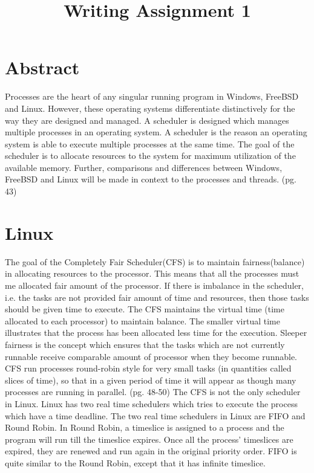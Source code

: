 \documentclass[letterpaper,10pt,titlepage]{IEEEtran}
\author{\name}
\title{Writing Assignment 1}
\begin{document}
\maketitle
\hrulefill

\section{Abstract}

Processes are the heart of any singular running program in Windows, FreeBSD and Linux.
However, these operating systems differentiate distinctively for the way they are designed and managed. A scheduler is designed which manages multiple processes in an operating system. A scheduler is the reason an operating system is able to execute multiple processes at the same time. The goal of the scheduler is to allocate resources to the system for maximum utilization of the available memory. Further, comparisons and differences between Windows, FreeBSD and Linux will be made in context to the processes and threads. \cite{Love} (pg. 43)

\section{Linux}
The goal of the Completely Fair Scheduler(CFS) is to maintain fairness(balance) in allocating resources to the processor. This means that all the processes must me allocated fair amount of the processor. If there is imbalance in the scheduler, i.e. the tasks are not provided fair amount of time and resources, then those tasks should be given time to execute. \cite{sarkar:online}
The CFS maintains the virtual time (time allocated to each processor) to maintain balance. The smaller virtual time illustrates that the process has been allocated less time for the execution. Sleeper fairness is the concept which ensures that the tasks which are not currently runnable receive comparable amount of processor when they become runnable. \cite{sarkar:online} CFS run processes round-robin style for very small tasks (in quantities called slices of time), so that in a given period of time it will appear as though many processes are running in parallel. \cite{Love} (pg. 48-50)
The CFS is not the only scheduler in Linux. Linux has two real time schedulers which tries to execute the process which have a time deadline. The two real time schedulers in Linux are FIFO and Round Robin. In Round Robin, a timeslice is assigned to a process and the program will run till the timeslice expires. Once all the process' timeslices are expired, they are renewed and run again in the original priority order. FIFO is quite similar to the Round Robin, except that it has infinite timeslice.\cite{sarkar:online}
\end{document}
